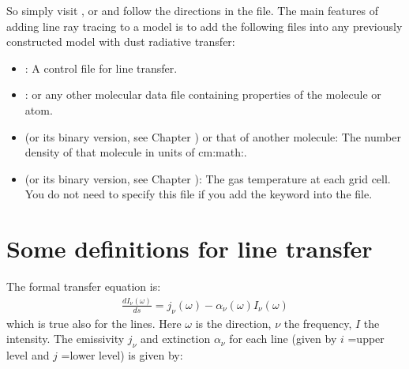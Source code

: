 \documentclass[letterpaper,10pt,english]{sphinxmanual}
\begin{document}
So simply visit , 
or  and follow the directions in the  file.
The main features of adding line ray tracing to a model is
to add the following files into any previously constructed model with dust
radiative transfer:
\begin{itemize}
\item {} 
: A control file for line transfer.

\item {} 
: or any other molecular data file
containing properties of the molecule or atom.

\item {} 
 (or its binary version, see Chapter
{\hyperref[\detokenize{binaryio:chap-binary-io}]{}}) or that of another molecule: The number density of
that molecule in units of cm:math:.

\item {} 
 (or its binary version, see Chapter
{\hyperref[\detokenize{binaryio:chap-binary-io}]{}}): The gas temperature at each grid cell. You do not
need to specify this file if you add the keyword 
into the  file.

\end{itemize}


\section{Some definitions for line transfer}
\label{\detokenize{lineradtrans:some-definitions-for-line-transfer}}\label{\detokenize{lineradtrans:sec-line-trans-definitions}}
The formal transfer equation is:
\begin{equation*}
\begin{split}\frac{dI_\nu(\omega)}{ds} = j_\nu(\omega) - \alpha_\nu(\omega)I_\nu(\omega)\end{split}
\end{equation*}
which is true also for the lines. Here \(\omega\) is the direction,
\(\nu\) the frequency, \(I\) the intensity.  The emissivity
\(j_\nu\) and extinction \(\alpha_\nu\) for each line (given by
\(i\) =upper level and \(j\) =lower level) is given by:
\end{document}
